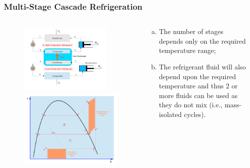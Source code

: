 \documentclass[10pt,compress]{beamer}
\begin{document}
\begin{frame}
 \frametitle{Multi-Stage Cascade Refrigeration}
 \begin{columns}
  \begin{column}[c]{0.45\linewidth}
   \begin{figure}%
     \vbox{
      \includegraphics[width=4.5cm,height=3.5cm,clip]{./Pics/Overview_Refrig24}
      \vspace{-.1cm}
      \includegraphics[width=4.cm,height=4.cm,clip]{./Pics/Overview_Refrig25}}
   \end{figure}  
  \end{column}  
  \begin{column}[c]{0.55\linewidth}
   \begin{enumerate}[(a)]
    \item <1-> The number of stages depends only on the required temperature range;
    \item <2-> The refrigerant fluid will also depend upon the required temperature and thus 2 or more fluids can be used as they do not mix (i.e., mass-isolated cycles).
   \end{enumerate}
  \end{column}  
 \end{columns} 
\end{frame}
\end{document}
